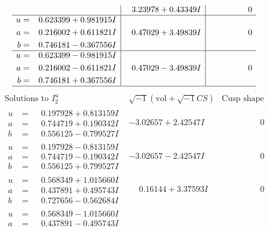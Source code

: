 \documentclass[1p]{elsarticle_modified}
\theoremstyle{definition}
\newcommand{\I}{\sqrt{-1}}
\begin{document}
$$\begin{array}{c|c|c}
 & \phantom{-}3.23978 + 0.43349 I & \phantom{-0.000000 } 0 \\ \hline\begin{aligned}
u &= \phantom{-}0.623399 + 0.981915 I \\
a &= \phantom{-}0.216002 + 0.611821 I \\
b &= \phantom{-}0.746181 - 0.367556 I\end{aligned}
 & \phantom{-}0.47029 + 3.49839 I & \phantom{-0.000000 } 0 \\ \hline\begin{aligned}
u &= \phantom{-}0.623399 - 0.981915 I \\
a &= \phantom{-}0.216002 - 0.611821 I \\
b &= \phantom{-}0.746181 + 0.367556 I\end{aligned}
 & \phantom{-}0.47029 - 3.49839 I & \phantom{-0.000000 } 0\\
 \hline 
 \end{array}$$\newpage$$\begin{array}{c|c|c}  
\text{Solutions to }I^u_{2}& \I (\text{vol} + \sqrt{-1}CS) & \text{Cusp shape}\\
 \hline 
\begin{aligned}
u &= \phantom{-}0.197928 + 0.813159 I \\
a &= \phantom{-}0.744719 + 0.190342 I \\
b &= \phantom{-}0.556125 - 0.799527 I\end{aligned}
 & -3.02657 + 2.42547 I & \phantom{-0.000000 } 0 \\ \hline\begin{aligned}
u &= \phantom{-}0.197928 - 0.813159 I \\
a &= \phantom{-}0.744719 - 0.190342 I \\
b &= \phantom{-}0.556125 + 0.799527 I\end{aligned}
 & -3.02657 - 2.42547 I & \phantom{-0.000000 } 0 \\ \hline\begin{aligned}
u &= \phantom{-}0.568349 + 1.015660 I \\
a &= \phantom{-}0.437891 + 0.495743 I \\
b &= \phantom{-}0.727656 - 0.562684 I\end{aligned}
 & \phantom{-}0.16144 + 3.37593 I & \phantom{-0.000000 } 0 \\ \hline\begin{aligned}
u &= \phantom{-}0.568349 - 1.015660 I \\
a &= \phantom{-}0.437891 - 0.495743 I \\

\end{aligned}
\end{array}$$
\end{document}
